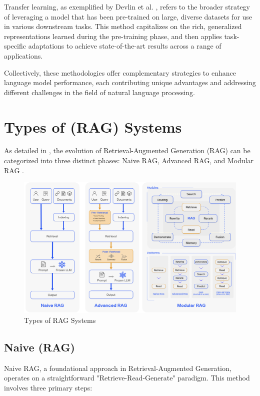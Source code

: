Transfer learning, as exemplified by Devlin et al. \cite{devlin2018bert}, refers to the broader strategy of leveraging a model that has been pre-trained on large, diverse datasets for use in various downstream tasks. This method capitalizes on the rich, generalized representations learned during the pre-training phase, and then applies task-specific adaptations to achieve state-of-the-art results across a range of applications.

Collectively, these methodologies offer complementary strategies to enhance language model performance, each contributing unique advantages and addressing different challenges in the field of natural language processing.

\section{Types of (RAG) Systems}
As detailed in \cite{gao2024retrieval}, the evolution of Retrieval-Augmented Generation (RAG) can be categorized into three distinct phases: Naive RAG, Advanced RAG, and Modular RAG .
\begin{figure}[h]
	\centering
	\includegraphics[width=0.9\linewidth]{Figures/rag_types.png}
	\caption{Types of RAG Systems}
	\label{rag_architectur.png}
\end{figure}
\subsection{Naive (RAG)}
Naive RAG, a foundational approach in Retrieval-Augmented Generation, operates on a straightforward "Retrieve-Read-Generate" paradigm. This method involves three primary steps:

